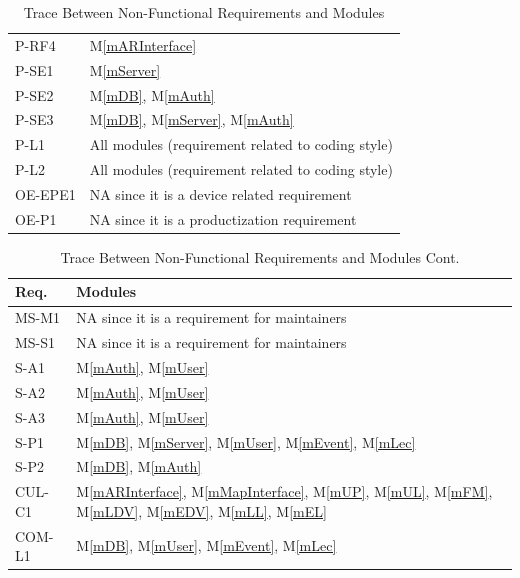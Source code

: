 \documentclass[12pt, titlepage]{article}
\newcommand{\mref}[1]{M\ref{#1}}
\begin{document}
\begin{table}[H]
\begin{tabular}{p{} p{}}
P-RF4 & \mref{mARInterface}\\
P-SE1 & \mref{mServer}\\
P-SE2 & \mref{mDB}, \mref{mAuth}\\
P-SE3 & \mref{mDB}, \mref{mServer}, \mref{mAuth}\\
P-L1 & All modules (requirement related to coding style)\\
P-L2 & All modules (requirement related to coding style)\\
OE-EPE1 & NA since it is a device related requirement\\
OE-P1 & NA since it is a productization requirement\\
\bottomrule
\end{tabular}
\caption{Trace Between Non-Functional Requirements and Modules}
\label{TblNFRT}
\end{table}

\begin{table}[H]
\centering
\begin{tabular}{p{} p{}}
\toprule
\textbf{Req.} & \textbf{Modules}\\
\midrule
MS-M1 & NA since it is a requirement for maintainers\\
MS-S1 & NA since it is a requirement for maintainers\\
S-A1 & \mref{mAuth}, \mref{mUser}\\
S-A2 & \mref{mAuth}, \mref{mUser}\\
S-A3 & \mref{mAuth}, \mref{mUser}\\
S-P1 & \mref{mDB}, \mref{mServer}, \mref{mUser}, \mref{mEvent}, \mref{mLec}\\
S-P2 & \mref{mDB}, \mref{mAuth}\\
CUL-C1 & \mref{mARInterface}, \mref{mMapInterface}, \mref{mUP}, \mref{mUL}, \mref{mFM}, \mref{mLDV}, \mref{mEDV}, \mref{mLL}, \mref{mEL}\\
COM-L1 & \mref{mDB}, \mref{mUser}, \mref{mEvent}, \mref{mLec}\\
\bottomrule
\end{tabular}
\caption{Trace Between Non-Functional Requirements and Modules Cont.}
\label{TblNFRT-CONT}
\end{table}
\end{document}
